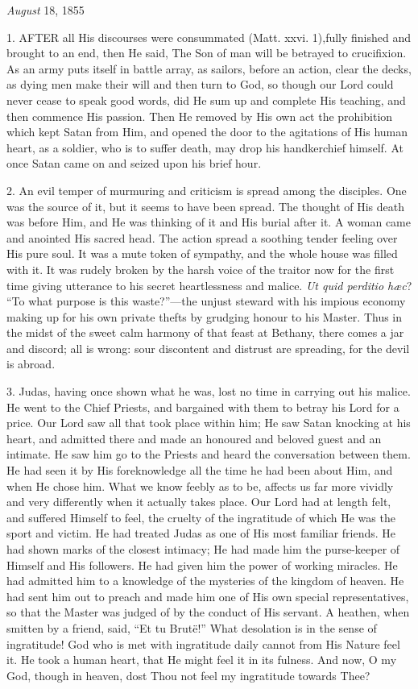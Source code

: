 \emph{August}
18, 1855

1. AFTER
all His discourses were consummated (Matt. xxvi. 1),\emph{}fully
finished and brought to an end, then He said, The Son of man will be
betrayed to crucifixion. As an army puts itself in battle array, as
sailors, before an action, clear the decks, as dying men make their will
and then turn to God, so though our Lord could never cease to speak good
words, did He sum up and complete His teaching, and then commence His
passion. Then He removed by His own act the prohibition which kept Satan
from Him, and opened the door to the agitations of His human heart, as a
soldier, who is to suffer death, may drop his handkerchief himself. At
once Satan came on and seized upon his brief hour.

2. An evil temper of murmuring
and criticism is spread among the disciples. One was the source of it,
but it seems to have been spread. The thought of His death was
before Him, and He was thinking of it and His burial after it. A woman
came and anointed His sacred head. The action spread a soothing tender
feeling over His pure soul. It was a mute token of sympathy, and the
whole house was filled with it. It was rudely broken by the harsh voice
of the traitor now for the first time giving utterance to his secret
heartlessness and malice. \emph{Ut quid perditio hæc}? ``To what purpose
is this waste?''—the unjust steward with his impious economy making up
for his own private thefts by grudging honour to his Master. Thus in the
midst of the sweet calm harmony of that feast at Bethany, there comes a
jar and discord; all is wrong: sour discontent and distrust are
spreading, for the devil is abroad.

3. Judas, having once shown what
he was, lost no time in carrying out his malice. He went to the Chief
Priests, and bargained with them to betray his Lord for a price. Our
Lord saw all that took place within him; He saw Satan knocking at his
heart, and admitted there and made an honoured and beloved guest and an
intimate. He saw him go to the Priests and heard the conversation
between them. He had seen it by His foreknowledge all the time he had
been about Him, and when He chose him. What we know feebly as to be,
affects us far more vividly and very differently when it actually takes
place. Our Lord had at length felt, and suffered Himself to feel, the
cruelty of the ingratitude of which He was the sport and victim. He had
treated Judas as one of His most familiar friends. He had shown marks of
the closest intimacy; He had made him the purse-keeper of Himself
and His followers. He had given him the power of working miracles. He
had admitted him to a knowledge of the mysteries of the kingdom of
heaven. He had sent him out to preach and made him one of His own
special representatives, so that the Master was judged of by the conduct
of His servant. A heathen, when smitten by a friend, said, ``Et tu Brutë!''
What desolation is in the sense of ingratitude! God who is met with
ingratitude daily cannot from His Nature feel it. He took a human heart,
that He might feel it in its fulness. And now, O my God, though in
heaven, dost Thou not feel my ingratitude towards Thee?

